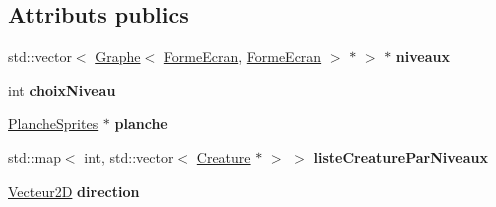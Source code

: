\subsection*{Attributs publics}
\begin{DoxyCompactItemize}
\item 
\mbox{\label{class_fenetre_ecran_a3f631197b0880c37be1b879b0f84f592}} 
std\+::vector$<$ \mbox{\hyperlink{class_graphe}{Graphe}}$<$ \mbox{\hyperlink{class_forme_ecran}{Forme\+Ecran}}, \mbox{\hyperlink{class_forme_ecran}{Forme\+Ecran}} $>$ $\ast$ $>$ $\ast$ {\bfseries niveaux}
\item 
\mbox{\label{class_fenetre_ecran_af1585f2e758cc15abc9291caba7a0cbd}} 
int {\bfseries choix\+Niveau}
\item 
\mbox{\label{class_fenetre_ecran_a9f07d3864284bc6fe8f506b30d9906ef}} 
\mbox{\hyperlink{class_planche_sprites}{Planche\+Sprites}} $\ast$ {\bfseries planche}
\item 
\mbox{\label{class_fenetre_ecran_ae87845902f0c9fb8f6cbcb091062df64}} 
std\+::map$<$ int, std\+::vector$<$ \mbox{\hyperlink{class_creature}{Creature}} $\ast$ $>$ $>$ {\bfseries liste\+Creature\+Par\+Niveaux}
\item 
\mbox{\label{class_fenetre_ecran_a6665b9f790eb76f887bd2850e2b1bed5}} 
\mbox{\hyperlink{class_vecteur2_d}{Vecteur2D}} {\bfseries direction}
\end{DoxyCompactItemize}
